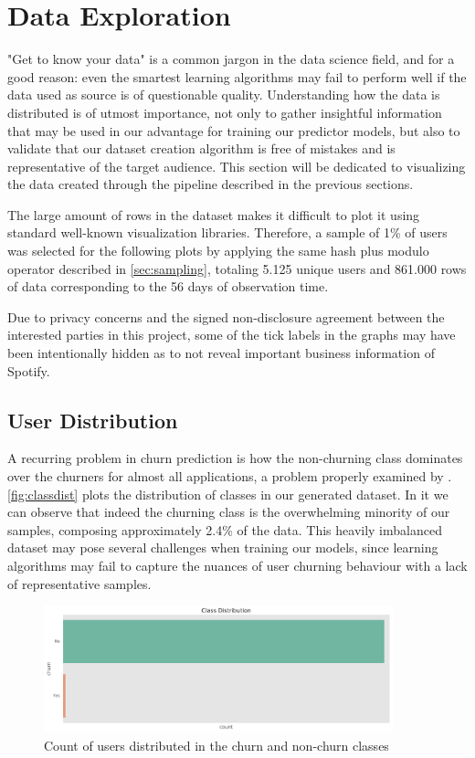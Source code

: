 \documentclass{kththesis}
\begin{document}
\section{Data Exploration}

"Get to know your data" is a common jargon in the data science field, and for a good reason: even the smartest learning algorithms may fail to perform well if the data used as source is of questionable quality. Understanding how the data is distributed is of utmost importance, not only to gather insightful information that may be used in our advantage for training our predictor models, but also to validate that our dataset creation algorithm is free of mistakes and is representative of the target audience. This section will be dedicated to visualizing the data created through the pipeline described in the previous sections.

The large amount of rows in the dataset makes it difficult to plot it using standard well-known visualization libraries. Therefore, a sample of 1\% of users was selected for the following plots by applying the same hash plus modulo operator described in \autoref{sec:sampling}, totaling 5.125 unique users and 861.000 rows of data corresponding to the 56 days of observation time.

Due to privacy concerns and the signed non-disclosure agreement between the interested parties in this project, some of the tick labels in the graphs may have been intentionally hidden as to not reveal important business information of Spotify.

\subsection{User Distribution}

A recurring problem in churn prediction is how the non-churning class dominates over the churners for almost all applications, a problem properly examined by \citep{Burez2009}. \autoref{fig:classdist} plots the distribution of classes in our generated dataset. In it we can observe that indeed the churning class is the overwhelming minority of our samples, composing approximately 2.4\% of the data. This heavily imbalanced dataset may pose several challenges when training our models, since learning algorithms may fail to capture the nuances of user churning behaviour with a lack of representative samples.

	\begin{figure}[H]
    \centering
    \includegraphics[width=0.9\textwidth,height=0.9\textheight,keepaspectratio]{figures/class_dist.pdf}
    \caption{Count of users distributed in the churn and non-churn classes}
    \label{fig:classdist}
	\end{figure}
\end{document}
